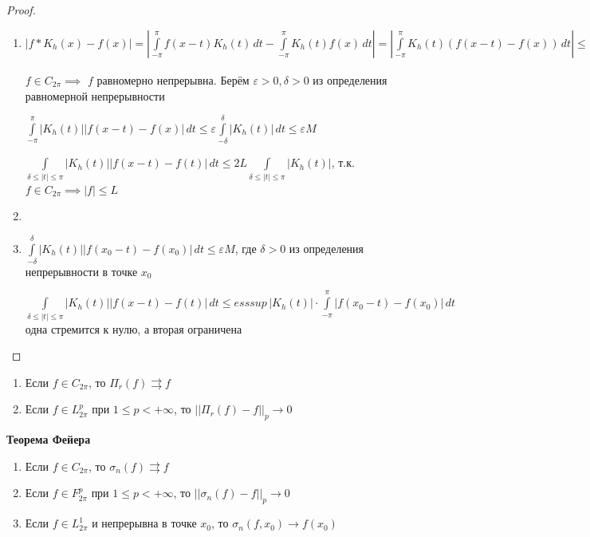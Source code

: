 \begin{proof}
    \begin{enumerate}
        \item {
            $|f * K_h (x) - f(x)| = |\int\limits_{-\pi}^\pi f(x - t) K_h (t) \, dt - \int\limits_{-\pi}^\pi K_h (t) f(x) \, dt| = |\int\limits_{-\pi}^\pi K_h (t) (f(x - t) - f(x)) \, dt | \leqslant \int\limits_{-\pi}^\pi |K_h (t)| |f(x - t) - f(x)| \, dt = \int\limits_{-\delta}^\delta + \int\limits_{\delta \leqslant |t| \leqslant \pi}$

            $f \in C_{2\pi} \implies$ $f$ равномерно непрерывна. Берём $\varepsilon > 0, \delta > 0$ из определения равномерной непрерывности

            $\int\limits_{-\pi}^\pi |K_h (t)| |f(x - t) - f(x)| \, dt \leqslant \varepsilon \int\limits_{-\delta}^\delta |K_h (t)| \, dt \leqslant \varepsilon M$

            $\int\limits_{\delta \leqslant |t| \leqslant \pi} |K_h (t)||f(x - t) - f(t)| \, dt \leqslant 2L \int\limits_{\delta \leqslant |t| \leqslant \pi} |K_h (t)|$, т.к. $f \in C_{2\pi} \implies |f| \leqslant L$
        }
        \item {
        }
        \item {
            $\int\limits_{-\delta}^\delta |K_h (t)| |f(x_0 - t) - f(x_0)| \, dt \leqslant \varepsilon M$, где $\delta > 0$ из определения непрерывности в точке $x_0$

            $\int\limits_{\delta \leqslant |t| \leqslant \pi} |K_h (t)||f(x - t) - f(t)| \, dt \leqslant esssup \, |K_h (t)| \cdot \int\limits_{-\pi}^\pi |f(x_0 - t) - f(x_0)| \, dt$ одна стремится к нулю, а вторая ограничена


        }
    \end{enumerate}
\end{proof}

\begin{consequence}
    \begin{enumerate}
        \item Если $f \in C_{2\pi}$, то $\Pi_r (f) \rightrightarrows f$
        \item Если $f \in L_{2\pi}^p$ при $1 \leqslant p < +\infty$, то $||\Pi_r (f) - f||_p \rightarrow 0$
    \end{enumerate}
\end{consequence}

\begin{theorem}
\textbf{Теорема Фейера}

    \begin{enumerate}
        \item Если $f \in C_{2\pi}$, то $\sigma_n (f) \rightrightarrows f$
        \item Если $f \in F_{2\pi}^p$ при $1 \leqslant p < +\infty$, то $||\sigma_n (f) - f||_p \rightarrow 0$
        \item Если $f \in L_{2\pi}^1$ и непрерывна в точке $x_0$, то $\sigma_n (f, x_0) \rightarrow f(x_0)$
    \end{enumerate}
\end{theorem}

